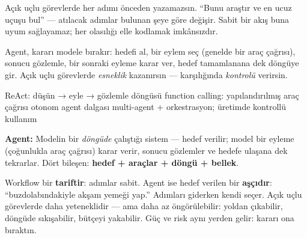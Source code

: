 

Açık uçlu görevlerde her adımı önceden yazamazsın. ``Bunu araştır ve en ucuz
uçuşu bul'' --- atılacak adımlar bulunan şeye göre değişir. Sabit bir akış buna
uyum sağlayamaz; her olasılığı elle kodlamak imkânsızdır.


Agent, kararı modele bırakır: hedefi al, bir eylem seç (genelde bir araç çağrısı),
sonucu gözlemle, bir sonraki eyleme karar ver, hedef tamamlanana dek döngüye gir.
Açık uçlu görevlerde \emph{esneklik} kazanırsın --- karşılığında \emph{kontrolü}
verirsin.

\begin{timeline}
 ReAct: düşün → eyle → gözlemle döngüsü \tlsep {} function calling: yapılandırılmış araç çağrısı \tlsep {} otonom agent dalgası \tlsep {} multi-agent + orkestrasyon; üretimde kontrollü kullanım
\end{timeline}

\begin{problembox}
\textbf{Agent:} Modelin bir \emph{döngüde} çalıştığı sistem --- hedef verilir;
model bir eyleme (çoğunlukla araç çağrısı) karar verir, sonucu gözlemler ve
hedefe ulaşana dek tekrarlar. Dört bileşen: \textbf{hedef + araçlar + döngü + bellek}.
\end{problembox}

\begin{mentalbox}
Workflow bir \textbf{tariftir}: adımlar sabit. Agent ise hedef verilen bir
\textbf{aşçıdır}: ``buzdolabındakiyle akşam yemeği yap.'' Adımları giderken
kendi seçer. Açık uçlu görevlerde daha yeteneklidir --- ama daha az öngörülebilir:
yoldan çıkabilir, döngüde sıkışabilir, bütçeyi yakabilir. Güç ve risk aynı
yerden gelir: kararı ona bıraktın.
\end{mentalbox}


